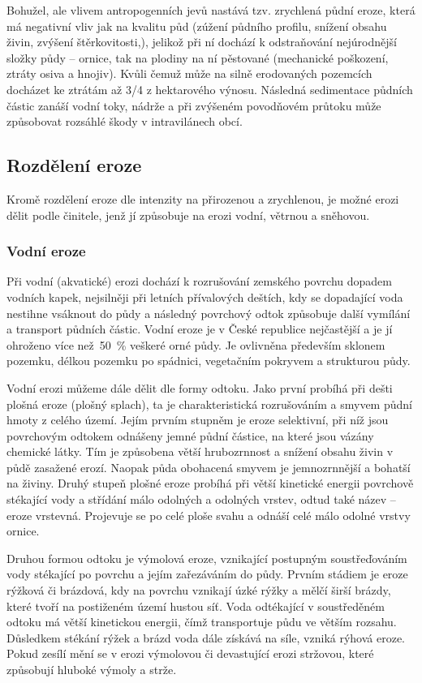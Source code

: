 Bohužel, ale vlivem antropogenních jevů nastává tzv. zrychlená půdní
eroze, která má negativní vliv jak na kvalitu půd (zúžení půdního
profilu, snížení obsahu živin, zvýšení štěrkovitosti,), jelikož při ní
dochází k odstraňování nejúrodnější složky půdy – ornice, tak na
plodiny na ní pěstované (mechanické poškození, ztráty osiva a
hnojiv). Kvůli čemuž může na silně erodovaných pozemcích docházet ke
ztrátám až 3/4 z hektarového výnosu. Následná sedimentace půdních
částic zanáší vodní toky, nádrže a při zvýšeném povodňovém průtoku
může způsobovat rozsáhlé škody v intravilánech obcí.\cite{Novotny2014}
\subsection{Rozdělení eroze}
Kromě rozdělení eroze dle intenzity na přirozenou a zrychlenou, je
možné erozi dělit podle činitele, jenž jí způsobuje na erozi vodní,
větrnou a sněhovou.\cite{Holy1994}
\subsubsection{Vodní eroze}
Při vodní (akvatické) erozi dochází k rozrušování zemského povrchu
dopadem vodních kapek, nejsilněji při letních přívalových deštích, kdy
se dopadající voda nestihne vsáknout do půdy a následný povrchový
odtok způsobuje další vymílání a transport půdních částic. Vodní eroze
je v České republice nejčastější a je jí ohroženo více než~50~\%
veškeré orné půdy. Je ovlivněna především sklonem pozemku, délkou
pozemku po spádnici, vegetačním pokryvem a strukturou půdy.

Vodní erozi můžeme dále dělit dle formy odtoku. Jako první probíhá při
dešti plošná eroze (plošný splach), ta je charakteristická
rozrušováním a smyvem půdní hmoty z celého území. Jejím prvním stupněm
je eroze selektivní, při níž jsou povrchovým odtokem odnášeny jemné
půdní částice, na které jsou vázány chemické látky. Tím je způsobena
větší hrubozrnnost a snížení obsahu živin v půdě zasažené
erozí. Naopak půda obohacená smyvem je jemnozrnnější a bohatší na
živiny. Druhý stupeň plošné eroze probíhá při větší kinetické energii
povrchově stékající vody a střídání málo odolných a odolných vrstev,
odtud také název – eroze vrstevná. Projevuje se po celé ploše svahu a
odnáší celé málo odolné vrstvy ornice.

Druhou formou odtoku je výmolová eroze, vznikající postupným
soustřeďováním vody stékající po povrchu a jejím zařezáváním do
půdy. Prvním stádiem je eroze rýžková či brázdová, kdy na povrchu
vznikají úzké rýžky a mělčí širší brázdy, které tvoří na postiženém
území hustou síť. Voda odtékající v soustředěném odtoku má větší
kinetickou energii, čímž transportuje půdu ve větším
rozsahu. Důsledkem stékání rýžek a brázd voda dále získává na síle,
vzniká rýhová eroze. Pokud zesílí mění se v erozi výmolovou či
devastující erozi stržovou, které způsobují hluboké výmoly a
strže.\cite{Novotny2014}
